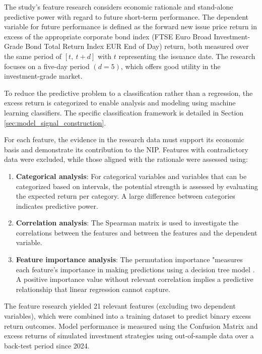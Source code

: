 The study's feature research considers economic rationale and stand-alone predictive power with regard to future short-term performance. The dependent variable for future performance is defined as the forward new issue price return in excess of the appropriate corporate bond index (FTSE Euro Broad Investment-Grade Bond Total Return Index EUR End of Day) return, both measured over the same period of $[t,\ t + d]$ with $t$ representing the issuance date. The research focuses on a five-day period $(d=5)$, which offers good utility in the investment-grade market.

To reduce the predictive problem to a classification rather than a regression, the excess return is categorized to enable analysis and modeling using machine learning classifiers. The specific classification framework is detailed in Section \ref{sec:model_signal_construction}.

For each feature, the evidence in the research data must support its economic basis and demonstrate its contribution to the NIP. Features with contradictory data were excluded, while those aligned with the rationale were assessed using:

\begin{enumerate}
    \item \textbf{Categorical analysis}: For categorical variables and variables that can be categorized based on intervals, the potential strength is assessed by evaluating the expected return per category. A large difference between categories indicates predictive power.
    \item \textbf{Correlation analysis}: The Spearman matrix is used to investigate the correlations between the features and between the features and the dependent variable.
    \item \textbf{Feature importance analysis}: The permutation importance "measures each feature's importance in making predictions using a decision tree model \parencite[p. 140]{Harrison2023EffectiveModels}. A positive importance value without relevant correlation implies a predictive relationship that linear regression cannot capture.
\end{enumerate}

The feature research yielded 21 relevant features (excluding two dependent variables), which were combined into a training dataset to predict binary excess return outcomes. Model performance is measured using the Confusion Matrix and excess returns of simulated investment strategies using out-of-sample data over a back-test period since 2024.

